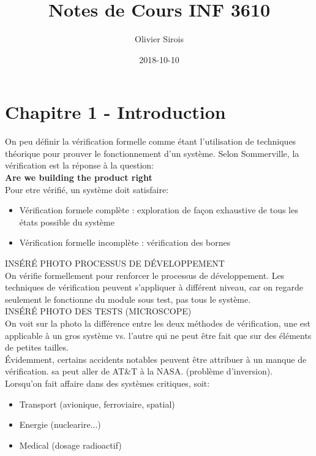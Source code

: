 \documentclass[oneside]{book}
\title{Notes de Cours INF 3610}
\date{2018-10-10}
\author{Olivier Sirois}
\begin{document}
    \setcounter{page}{1}
    \maketitle
    \tableofcontents
    \chapter{Chapitre 1 - Introduction}
    On peu définir la vérification formelle comme étant l'utilisation de techniques théorique pour prouver le fonctionnement d'un système. Selon Sommerville, la vérification est la réponse à la question:\\
    \textbf{Are we building the product right}\\
    
    Pour etre vérifié, un système doit satisfaire:
    \begin{itemize}
        \item Vérification formele complète : exploration de façon exhaustive de tous les états possible du système
        \item Vérification formelle incomplète : vérification des bornes
    \end{itemize}

    INSÉRÉ PHOTO PROCESSUS DE DÉVELOPPEMENT\\
    On vérifie formellement pour renforcer le processus de développement. Les techniques de vérification peuvent s'appliquer à différent niveau, car on regarde seulement le fonctionne du module sous test, pas tous le système.\\
    
    INSÉRÉ PHOTO DES TESTS (MICROSCOPE)\\
    
    On voit sur la photo la différence entre les deux méthodes de vérification, une est applicable à un gros système vs. l'autre qui ne peut être fait que sur des éléments de petites tailles.\\
    
    Évidemment, certains accidents notables peuvent être attribuer à un manque de vérification. sa peut aller de AT\&T à la NASA. (problème d'inversion).\\
    
    Lorsqu'on fait affaire dans des systèmes critiques, soit:
    \begin{itemize}
        \item Transport (avionique, ferroviaire, spatial)
        \item Energie (nuclearire...)
        \item Medical (dosage radioactif)
    \end{itemize}
\end{document}
